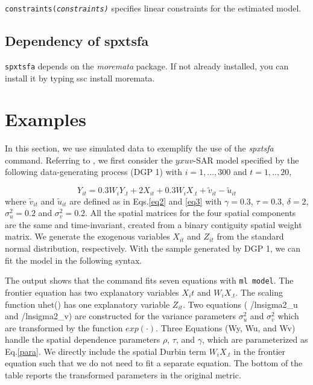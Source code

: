 \hangpara
{\tt constraints(\it constraints)}  specifies linear constraints for the estimated model. 


\subsection{Dependency of spxtsfa}
{\tt spxtsfa} depends on the {\it moremata }package. If not already installed, you can install it by typing ssc install moremata.


\section{Examples}\label{sec_example}
In this section, we use simulated data to  exemplify the use of the \textit{spxtsfa} command.  Referring to , we first consider the $yxuv$-SAR model specified by the following data-generating process (DGP 1) with $i=1,...,300$ and $t=1,..,20$,

\begin{equation}\label{dgp1}
	Y_{it} = 0.3W_{i}Y_{.t}+2X_{it}+ 0.3W_{i}X_{.t}  + \tilde{v}_{it}-\tilde{u}_{it}
\end{equation}
where $\tilde{v}_{it}$ and $\tilde{u}_{it}$ are defined as in Eqs.\eqref{eq2} and \eqref{eq3} with $\gamma=0.3$, $\tau=0.3$, $\delta=2$, $\sigma_{u}^2=0.2$ and $\sigma_v^2 =0.2$. All the spatial matrices for the four spatial components are the same and time-invariant, created from a binary contiguity spatial weight matrix. We generate the exogenous variables $X_{it}$ and $Z_{it}$ from the standard normal distribution, respectively. With the sample generated by DGP 1, we can fit the model in the following syntax.

\begin{stlog}
	
\end{stlog}

The output shows that the command fits seven equations with {\tt ml model}. The frontier equation has two explanatory variables $X_it$ and $W_iX_{.t}$. The scaling function uhet() has one explanatory variable $Z_{it}$.  Two equations ( /lnsigma2\_u and /lnsigma2\_v) are constructed for the variance parameters $\sigma_u^2$ and $\sigma_v^2$ which are transformed by the function $exp(\cdot)$. Three Equations (Wy, Wu, and Wv) handle the spatial dependence parameters $\rho$, $\tau$, and $\gamma$, which are parameterized as Eq.\eqref{para}. We directly include the spatial Durbin term $W_iX_{.t}$ in the frontier equation such that we do not need to fit a separate equation.  The bottom of the table reports the transformed parameters in the original metric.

